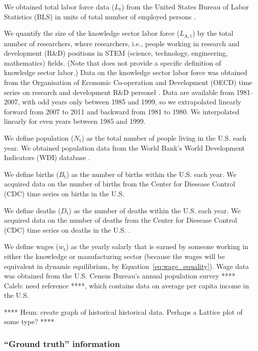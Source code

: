 \documentclass[letterpaper,12pt]{article}
\begin{document}
We obtained total labor force data ($L_\mathrm{t}$) from the United States Bureau of Labor Statistics (BLS) in units of total number of employed persons \citep{BLS:2013a}. 

We quantify the size of the knowledge sector labor force ($L_\mathrm{A,t}$) by the total number of researchers, where researchers, i.e., people working in research and development (R\&D) positions in STEM (science, technology, engineering, mathematics) fields. (Note that \citet{Jones:2001wn} does not provide a specific definition of knowledge sector labor.) Data on the knowledge sector labor force was obtained from the Organisation of Economic Co-operation and Development (OECD) time series on research and development R\&D personel \citep{OECDStatExtracts:2013a}. Data are available from 1981--2007, with odd years only between 1985 and 1999, so we extrapolated linearly forward from 2007 to 2011 and backward from 1981 to 1980. We interpolated linearly for even years between 1985 and 1999.

We define population ($N_\mathrm{t}$) as the total number of people living in the U.S. each year. We obtained population data from the World Bank's World Development Indicators (WDI) database \citep{WorldBankWDI:2013a}.

We define births ($B_\mathrm{t}$) as the number of births within the U.S. each year. We acquired data on the number of births from the Center for Diesease Control (CDC) time series on births in the U.S. \citep{Martin:2012tc, Hamilton:2012ww}

We define deaths ($D_\mathrm{t}$) as the number of deaths within the U.S. each year. We acquired data on the number of deaths from the Center for Diesease Control (CDC) time series on deaths in the U.S. \citep{Murphy:2013vg, Hoyert:2012tv}.

We define wages ($w_\mathrm{t}$) as the yearly salarly that is earned by someone working in either the knowledge or manufacturing sector (because the wages will be equivalent in dynamic equilibrium, by Equation~\ref{eq:wage_equality}). Wage data was obtained from the U.S. Census Bureau's annual population survey **** Caleb: need reference ****, which contains data on average per capita income in the U.S.

**** Heun: create graph of historical historical data. Perhaps a Lattice plot of some type? ****

\subsubsection{``Ground truth'' information}
\label{sec:basic_model_ground_truth}
\end{document}
